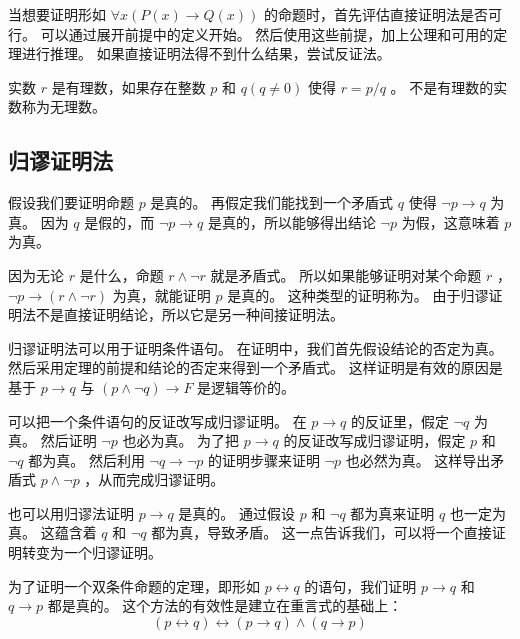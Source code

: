 {{        
        {
            当想要证明形如 $\forall x (P(x) \rightarrow Q(x))$ 的命题时，首先评估直接证明法是否可行。
            可以通过展开前提中的定义开始。
            然后使用这些前提，加上公理和可用的定理进行推理。
            如果直接证明法得不到什么结果，尝试反证法。
        }

        \begin{defines}
            实数 $r$ 是有理数，如果存在整数 $p$ 和 $q (q \neq 0)$ 使得 $r = p / q$ 。
            不是有理数的实数称为无理数。
        \end{defines}
    }

    \subsection{归谬证明法}
    {
        假设我们要证明命题 $p$ 是真的。
        再假定我们能找到一个矛盾式 $q$ 使得 $\neg p \rightarrow q$ 为真。
        因为 $q$ 是假的，而 $\neg p \rightarrow q$ 是真的，所以能够得出结论 $\neg p$ 为假，这意味着 $p$ 为真。

        因为无论 $r$ 是什么，命题 $r \wedge \neg r$ 就是矛盾式。
        所以如果能够证明对某个命题 $r$ ， $\neg p \rightarrow (r \wedge \neg r)$ 为真，就能证明 $p$ 是真的。
        这种类型的证明称为。
        由于归谬证明法不是直接证明结论，所以它是另一种间接证明法。

        归谬证明法可以用于证明条件语句。
        在证明中，我们首先假设结论的否定为真。
        然后采用定理的前提和结论的否定来得到一个矛盾式。
        这样证明是有效的原因是基于 $p \rightarrow q$ 与 $(p \wedge \neg q) \rightarrow F$ 是逻辑等价的。

        可以把一个条件语句的反证改写成归谬证明。
        在 $p \rightarrow q$ 的反证里，假定 $\neg q$ 为真。
        然后证明 $\neg p$ 也必为真。
        为了把 $p \rightarrow q$ 的反证改写成归谬证明，假定 $p$ 和 $\neg q$ 都为真。
        然后利用 $\neg q \rightarrow \neg p$ 的证明步骤来证明 $\neg p$ 也必然为真。
        这样导出矛盾式 $p \wedge \neg p$ ，从而完成归谬证明。

        也可以用归谬法证明 $p \rightarrow q$ 是真的。
        通过假设 $p$ 和 $\neg q$ 都为真来证明 $q$ 也一定为真。
        这蕴含着 $q$ 和 $\neg q$ 都为真，导致矛盾。
        这一点告诉我们，可以将一个直接证明转变为一个归谬证明。

        {
            为了证明一个双条件命题的定理，即形如 $p \leftrightarrow q$ 的语句，我们证明 $p \rightarrow q$ 和 $q \rightarrow p$ 都是真的。
            这个方法的有效性是建立在重言式的基础上：
            $$(p \leftrightarrow q) \leftrightarrow (p \rightarrow q) \wedge (q \rightarrow p)$$

}}}
